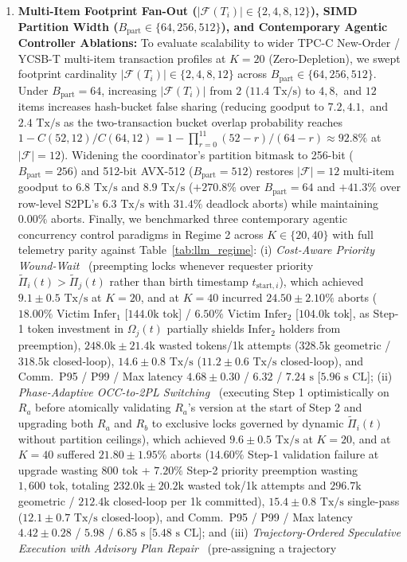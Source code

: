 \documentclass[conference,10pt]{IEEEtran}
\begin{document}
\begin{enumerate}
    \item \textbf{Multi-Item Footprint Fan-Out ($|\mathcal{F}(T_i)| \in \{2, 4, 8, 12\}$), SIMD Partition Width ($B_{\text{part}} \in \{64, 256, 512\}$), and Contemporary Agentic Controller Ablations:} To evaluate scalability to wider TPC-C New-Order / YCSB-T multi-item transaction profiles at $K=20$ (Zero-Depletion), we swept footprint cardinality $|\mathcal{F}(T_i)| \in \{2, 4, 8, 12\}$ across $B_{\text{part}} \in \{64, 256, 512\}$. Under $B_{\text{part}}=64$, increasing $|\mathcal{F}(T_i)|$ from $2$ ($11.4\text{ Tx/s}$) to $4, 8,$ and $12$ items increases hash-bucket false sharing (reducing goodput to $7.2, 4.1,$ and $2.4\text{ Tx/s}$ as the two-transaction bucket overlap probability reaches $1 - C(52,12)/C(64,12) = 1 - \prod_{r=0}^{11}(52-r)/(64-r) \approx 92.8\%$ at $|\mathcal{F}|=12$). Widening the coordinator's partition bitmask to 256-bit ($B_{\text{part}}=256$) and 512-bit AVX-512 ($B_{\text{part}}=512$) restores $|\mathcal{F}|=12$ multi-item goodput to $6.8\text{ Tx/s}$ and $8.9\text{ Tx/s}$ ($+270.8\%$ over $B_{\text{part}}=64$ and $+41.3\%$ over row-level S2PL's $6.3\text{ Tx/s}$ with $31.4\%$ deadlock aborts) while maintaining $0.00\%$ aborts. Finally, we benchmarked three contemporary agentic concurrency control paradigms in Regime 2 across $K \in \{20, 40\}$ with full telemetry parity against Table~\ref{tab:llm_regime}: (i) \textit{Cost-Aware Priority Wound-Wait}~\cite{abbott1992scheduling, rosenkrantz1978system} (preempting locks whenever requester priority $\tilde{\Pi}_i(t) > \tilde{\Pi}_j(t)$ rather than birth timestamp $t_{\text{start},i}$), which achieved $9.1 \pm 0.5\text{ Tx/s}$ at $K=20$, and at $K=40$ incurred $24.50 \pm 2.10\%$ aborts ($18.00\%$ Victim $\text{Infer}_1$ [$144.0\text{k tok}$] / $6.50\%$ Victim $\text{Infer}_2$ [$104.0\text{k tok}$], as Step-1 token investment in $\Omega_j(t)$ partially shields $\text{Infer}_2$ holders from preemption), $248.0\text{k} \pm 21.4\text{k}$ wasted tokens/1k attempts ($328.5\text{k}$ geometric / $318.5\text{k}$ closed-loop), $14.6 \pm 0.8\text{ Tx/s}$ ($11.2 \pm 0.6\text{ Tx/s}$ closed-loop), and Comm.\ P95 / P99 / Max latency $4.68 \pm 0.30$ / $6.32$ / $7.24\text{ s}$ [$5.96\text{ s CL}$]; (ii) \textit{Phase-Adaptive OCC-to-2PL Switching}~\cite{kung1981optimistic, harding2017evaluation} (executing Step 1 optimistically on $R_a$ before atomically validating $R_a$'s version at the start of Step 2 and upgrading both $R_a$ and $R_b$ to exclusive locks governed by dynamic $\tilde{\Pi}_i(t)$ without partition ceilings), which achieved $9.6 \pm 0.5\text{ Tx/s}$ at $K=20$, and at $K=40$ suffered $21.80 \pm 1.95\%$ aborts ($14.60\%$ Step-1 validation failure at upgrade wasting $800\text{ tok}$ + $7.20\%$ Step-2 priority preemption wasting $1{,}600\text{ tok}$, totaling $232.0\text{k} \pm 20.2\text{k}$ wasted tok/1k attempts and $296.7\text{k}$ geometric / $212.4\text{k}$ closed-loop per 1k committed), $15.4 \pm 0.8\text{ Tx/s}$ single-pass ($12.1 \pm 0.7\text{ Tx/s}$ closed-loop), and Comm.\ P95 / P99 / Max latency $4.42 \pm 0.28$ / $5.98$ / $6.85\text{ s}$ [$5.48\text{ s CL}$]; and (iii) \textit{Trajectory-Ordered Speculative Execution with Advisory Plan Repair}~\cite{chang2025sagallm, thomson2012calvin} (pre-assigning a trajectory 
\end{enumerate}
\end{document}
